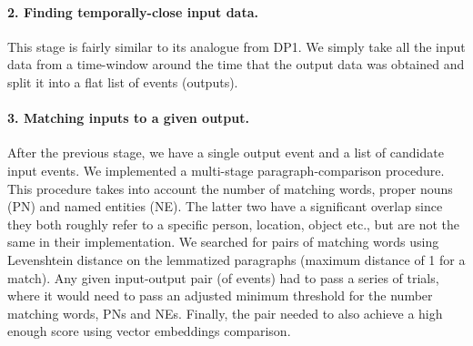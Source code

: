 \paragraph{2. Finding temporally-close input data.}
This stage is fairly similar to its analogue from DP1.
We simply take all the input data from a time-window around the time that the output data was obtained and split it into a flat list of events (outputs).

\paragraph{3. Matching inputs to a given output.}
After the previous stage, we have a single output event and a list of candidate input events.
We implemented a multi-stage paragraph-comparison procedure.
This procedure takes into account the number of matching words, proper nouns (PN) and named entities (NE).
The latter two have a significant overlap since they both roughly refer to a specific person, location, object etc., but are not the same in their implementation.
We searched for pairs of matching words using Levenshtein distance on the lemmatized paragraphs (maximum distance of 1 for a match).
Any given input-output pair (of events) had to pass a series of trials, where it would need to pass an adjusted minimum threshold for the number matching words, PNs and NEs.
Finally, the pair needed to also achieve a high enough score using vector embeddings comparison.
